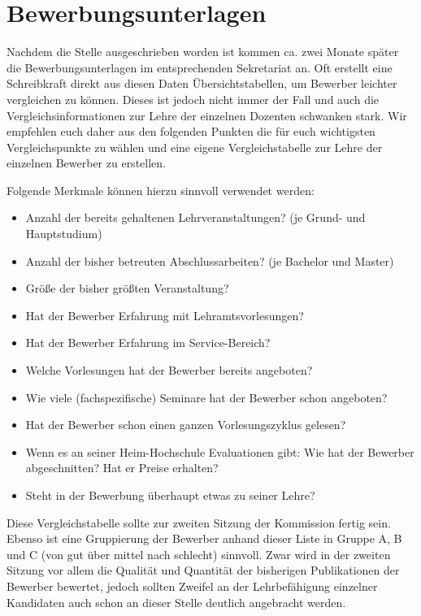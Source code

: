 \section{Bewerbungsunterlagen}\thispagestyle{fancy}
Nachdem die Stelle ausgeschrieben worden ist kommen ca. zwei Monate später die Bewerbungsunterlagen im entsprechenden Sekretariat an. Oft erstellt eine Schreibkraft direkt aus diesen Daten Übersichtstabellen, um Bewerber leichter vergleichen zu können. Dieses ist jedoch nicht immer der Fall und auch die Vergleichsinformationen zur Lehre der einzelnen Dozenten schwanken stark. Wir empfehlen euch daher aus den folgenden Punkten die für euch wichtigsten Vergleichspunkte zu wählen und eine eigene Vergleichstabelle zur Lehre der einzelnen Bewerber zu erstellen.

Folgende Merkmale können hierzu sinnvoll verwendet werden:
\begin{itemize}
    \item Anzahl der bereits gehaltenen Lehrveranstaltungen? (je Grund- und Hauptstudium)
    \item Anzahl der bisher betreuten Abschlussarbeiten? (je Bachelor und Master)
    \item Größe der bisher größten Veranstaltung?
    \item Hat der Bewerber Erfahrung mit Lehramtsvorlesungen?
    \item Hat der Bewerber Erfahrung im Service-Bereich?
    \item Welche Vorlesungen hat der Bewerber bereits angeboten?
    \item Wie viele (fachspezifische) Seminare hat der Bewerber schon angeboten?
    \item Hat der Bewerber schon einen ganzen Vorlesungszyklus gelesen?
    \item Wenn es an seiner Heim-Hochschule Evaluationen gibt: Wie hat der Bewerber abgeschnitten? Hat er Preise erhalten?
    \item Steht in der Bewerbung überhaupt etwas zu seiner Lehre?
\end{itemize}

Diese Vergleichstabelle sollte zur zweiten Sitzung der Kommission fertig sein. Ebenso ist eine Gruppierung der Bewerber anhand dieser Liste in Gruppe A, B und C (von gut über mittel nach schlecht) sinnvoll. Zwar wird in der zweiten Sitzung vor allem die Qualität und Quantität der bisherigen Publikationen der Bewerber bewertet, jedoch sollten Zweifel an der Lehrbefähigung einzelner Kandidaten auch schon an dieser Stelle deutlich angebracht werden.


